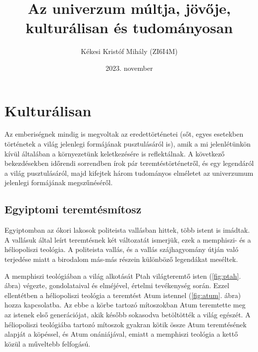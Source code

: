 \documentclass[a4paper]{article}
\title{Az univerzum múltja, jövője, kulturálisan és tudományosan}
\author{Kékesi Kristóf Mihály (ZI6I4M)}
\date{2023. november}
\begin{document}
\maketitle

\section*{Kulturálisan}
Az emberiségnek mindig is megvoltak az eredettörténetei (sőt, egyes esetekben történetek a világ jelenlegi formájának pusztulásáról is), amik a mi jelenlétünkön kívül általában a környezetünk keletkezésére is reflektálnak. A következő bekezdésekben időrendi sorrendben írok pár teremtéstörténetről, és egy legendáról a világ pusztulásáról, majd kifejtek három tudományos elméletet az univerzumum jelenlegi formájának megszűnéséről.

\subsection*{Egyiptomi teremtésmítosz}
Egyiptomban az ókori lakosok politeista vallásban hittek, több istent is imádtak. A vallásuk által leírt teremtésnek két változatát ismerjük, ezek a memphiszi- és a héliopoliszi teológia. A politeista vallás, és a vallás szájhagyomány útján való terjedése miatt a birodalom más-más részein különböző legendákat meséltek. \cite{egyiptologia}
\par
A memphiszi teológiában a világ alkotását Ptah világteremtő isten (\ref{fig:ptah}. ábra) végezte, gondolataival és elméjével, értelmi tevékenység során. Ezzel ellentétben a héliopoliszi teológia a teremtést Atum istennel (\ref{fig:atum}. ábra) hozza kapcsolatba. Az ebbe a körbe tartozó mítoszokban Atum teremtette meg az istenek első generációjat, akik később sokasodva betöltötték a világ egészét. A héliopoliszi teológiába tartozó mítoszok gyakran kötik össze Atum teremtésének alapját a köpéssel, és Atum onániájával, emiatt a memphiszi teológia a kettő közül a műveltebb felfogású. \cite{egyiptomiteologiak}
\end{document}
